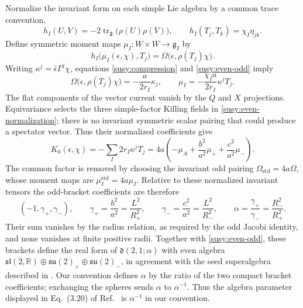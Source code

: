 Normalize the invariant form on each simple Lie algebra by a common trace convention,
\begin{equation}\label{susy:invariant-form}
 h_I(U,V)=-2\operatorname{tr}_{\mathbf2}\bigl(\rho(U)\rho(V)\bigr),
 \qquad h_I(T_j,T_k)=\chi_I\eta_{jk}.
\end{equation}
Define symmetric moment maps $\mu_I:W\times W\to\mathfrak g_I$ by
\begin{equation}\label{susy:moment-map}
 h_I\bigl(\mu_I(\epsilon,\chi),T_j\bigr)
 =\Omega\bigl(\epsilon,\rho(T_j)\chi\bigr).
\end{equation}
Writing $\kappa^j=\bar\epsilon\Gamma^j\chi$, equations
\eqref{susy:compression} and \eqref{susy:even-odd} imply
\begin{equation}\label{susy:moment-coefficients}
 \Omega\bigl(\epsilon,\rho(T_j)\chi\bigr)
 =-\frac{a}{2r_I}\kappa_j,
 \qquad
 \mu_I=-\frac{\chi_Ia}{2r_I}\kappa^jT_j.
\end{equation}
The flat components of the vector current vanish by the $Q$ and $X$ projections. Equivariance selects the three simple-factor Killing fields in \eqref{susy:even-normalization}; there is no invariant symmetric scalar pairing that could produce a spectator vector. Thus their normalized coefficients give
\begin{equation}\label{susy:seed-odd-bracket}
 K_0(\epsilon,\chi)
 =-\sum_I2r_I\kappa^jT_j
 =4a\left(-\mu_A+\frac{b^2}{a^2}\mu_+
                    +\frac{c^2}{a^2}\mu_-\right).
\end{equation}
The common factor is removed by choosing the invariant odd pairing
$\Omega_{\mathrm{std}}=4a\Omega$, whose moment maps are
$\mu_I^{\mathrm{std}}=4a\mu_I$. Relative to these normalized invariant tensors the odd-bracket coefficients are therefore
\begin{equation}\label{susy:exceptional-parameter}
 (-1,\gamma_+,\gamma_-),\qquad
 \gamma_+=\frac{b^2}{a^2}=\frac{L^2}{R_+^2},\qquad
 \gamma_-=\frac{c^2}{a^2}=\frac{L^2}{R_-^2},\qquad
 \alpha=\frac{\gamma_+}{\gamma_-}=\frac{R_-^2}{R_+^2}.
\end{equation}
Their sum vanishes by the radius relation, as required by the odd Jacobi identity, and none vanishes at finite positive radii. Together with \eqref{susy:even-odd}, these brackets define the real form of $\mathfrak d(2,1;\alpha)$ with even algebra
$\mathfrak{sl}(2,\mathbb R)\oplus\mathfrak{su}(2)_+\oplus\mathfrak{su}(2)_-$, in agreement with the seed superalgebra described in \cite{BachasEtAl2014}. Our convention defines $\alpha$ by the ratio of the two compact bracket coefficients; exchanging the spheres sends $\alpha$ to $\alpha^{-1}$. Thus the algebra parameter displayed in Eq.~(3.20) of Ref.~\cite{Noris2026} is $\alpha^{-1}$ in our convention.

